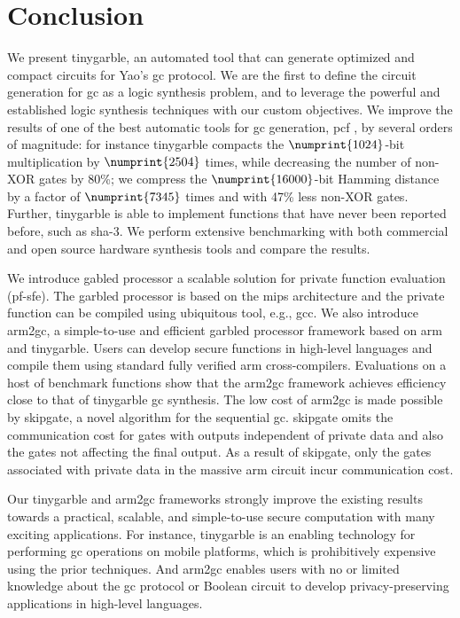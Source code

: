 \chapter{Conclusion}\label{chap:conclusion}
We present \gls{tinygarble}, an automated tool that can generate optimized and compact circuits for Yao's \acrfull{gc} protocol.
We are the first to define the circuit generation for \acrshort{gc} as a logic synthesis problem, and to leverage the powerful and established logic synthesis techniques with our custom objectives.
We improve the results of one of the best automatic tools for \acrshort{gc} generation, \gls{pcf} \cite{kreuter2013pcf}, by several orders of magnitude: for instance \gls{tinygarble} compacts the $\numprint{1024}$-bit multiplication by $\numprint{2504}$ times, while decreasing the number of non-XOR gates by 80\%; we compress the $\numprint{16000}$-bit Hamming distance by a factor of $\numprint{7345}$ times and with 47\% less non-XOR gates.
Further, \gls{tinygarble} is able to implement functions that have never been reported before, such as \acrshort{sha}-3.
We perform extensive benchmarking with both commercial and open source hardware synthesis tools and compare the results.

We introduce gabled processor a scalable solution for private function evaluation (\acrshort{pf-sfe}).
The garbled processor is based on the \gls{mips} architecture and the private function can be compiled using ubiquitous tool, e.g., gcc.
We also introduce \gls{arm2gc}, a simple-to-use and efficient garbled processor framework based on \gls{arm} and \gls{tinygarble}.
Users can develop secure functions in high-level languages and compile them using standard fully verified \gls{arm} cross-compilers.
Evaluations on a host of benchmark functions show that the \gls{arm2gc} framework achieves efficiency close to that of \gls{tinygarble} \acrshort{gc} synthesis.
The low cost of \gls{arm2gc} is made possible by \gls{skipgate}, a novel algorithm for the sequential \acrshort{gc}.
\gls{skipgate} omits the communication cost for gates with outputs independent of private data and also the gates not affecting the final output.
As a result of \gls{skipgate}, only the gates associated with private data in the massive \gls{arm} circuit incur communication cost.

Our \gls{tinygarble} and \gls{arm2gc} frameworks strongly improve the existing results towards a practical, scalable, and simple-to-use secure computation with many exciting applications.
For instance, \gls{tinygarble} is an enabling technology for performing \acrshort{gc} operations on mobile platforms, which is prohibitively expensive using the prior techniques.
And \gls{arm2gc} enables users with no or limited knowledge about the \acrshort{gc} protocol or Boolean circuit to develop privacy-preserving applications in high-level languages.
